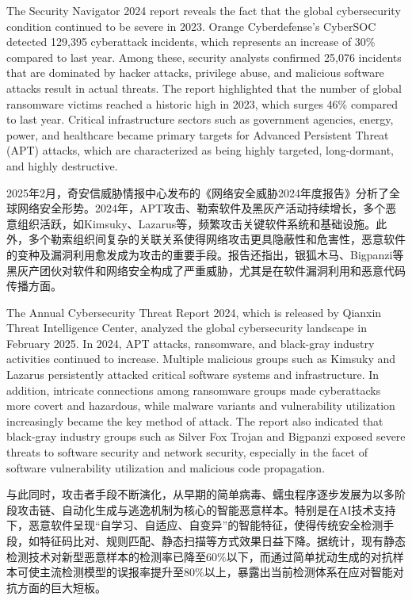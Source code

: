 The Security Navigator 2024 report reveals the fact that the global cybersecurity condition continued to be severe in 2023. Orange Cyberdefense's CyberSOC detected 129,395 cyberattack incidents, which represents an increase of 30\% compared to last year. Among these, security analysts confirmed 25,076 incidents that are dominated by hacker attacks, privilege abuse, and malicious software attacks result in actual threats. The report highlighted that the number of global ransomware victims reached a historic high in 2023, which surges 46\% compared to last year. Critical infrastructure sectors such as government agencies, energy, power, and healthcare became primary targets for Advanced Persistent Threat (APT) attacks, which are characterized as being highly targeted, long-dormant, and highly destructive.\cite{securitynavigator2024}

2025年2月，奇安信威胁情报中心发布的《网络安全威胁2024年度报告》分析了全球网络安全形势。2024年，APT攻击、勒索软件及黑灰产活动持续增长，多个恶意组织活跃，如Kimsuky、Lazarus等，频繁攻击关键软件系统和基础设施。此外，多个勒索组织间复杂的关联关系使得网络攻击更具隐蔽性和危害性，恶意软件的变种及漏洞利用愈发成为攻击的重要手段。报告还指出，银狐木马、Bigpanzi等黑灰产团伙对软件和网络安全构成了严重威胁，尤其是在软件漏洞利用和恶意代码传播方面\cite{qianxin2024}。

The Annual Cybersecurity Threat Report 2024, which is released by Qianxin Threat Intelligence Center, analyzed the global cybersecurity landscape in February 2025. In 2024, APT attacks, ransomware, and black-gray industry activities continued to increase. Multiple malicious groups such as Kimsuky and Lazarus persistently attacked critical software systems and infrastructure. In addition, intricate connections among ransomware groups made cyberattacks more covert and hazardous, while malware variants and vulnerability utilization increasingly became the key method of attack. The report also indicated that black-gray industry groups such as Silver Fox Trojan and Bigpanzi exposed severe threats to software security and network security, especially in the facet of software vulnerability utilization and malicious code propagation.

与此同时，攻击者手段不断演化，从早期的简单病毒、蠕虫程序逐步发展为以多阶段攻击链、自动化生成与逃逸机制为核心的智能恶意样本。特别是在AI技术支持下，恶意软件呈现“自学习、自适应、自变异”的智能特征，使得传统安全检测手段，如特征码比对、规则匹配、静态扫描等方式效果日益下降\cite{chen2018study, ren2021matching, lipp2022empirical}。据统计，现有静态检测技术对新型恶意样本的检测率已降至60\%以下，而通过简单扰动生成的对抗样本可使主流检测模型的误报率提升至80\%以上，暴露出当前检测体系在应对智能对抗方面的巨大短板。

